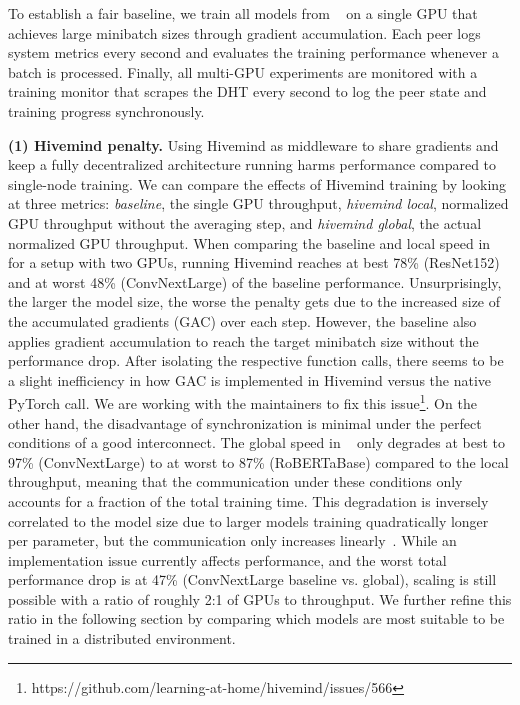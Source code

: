 To establish a fair baseline, we train all models from ~ on a single GPU that achieves large minibatch sizes through gradient accumulation.
Each peer logs system metrics every second and evaluates the training performance whenever a batch is processed.
Finally, all multi-GPU experiments are monitored with a training monitor that scrapes the DHT every second to log the peer state and training progress synchronously.

\textbf{(1) Hivemind penalty.} Using Hivemind as middleware to share gradients and keep a fully decentralized architecture running harms performance compared to single-node training. 
We can compare the effects of Hivemind training by looking at three metrics: \textit{baseline}, the single GPU throughput, \textit{hivemind local}, normalized GPU throughput without the averaging step, and \textit{hivemind global}, the actual normalized GPU throughput.
When comparing the baseline and local speed in ~ for a setup with two GPUs, running Hivemind reaches at best 78\% (ResNet152) and at worst 48\% (ConvNextLarge) of the baseline performance.
Unsurprisingly, the larger the model size, the worse the penalty gets due to the increased size of the accumulated gradients (GAC) over each step.
However, the baseline also applies gradient accumulation to reach the target minibatch size without the performance drop.
After isolating the respective function calls, there seems to be a slight inefficiency in how GAC is implemented in Hivemind versus the native PyTorch call.
We are working with the maintainers to fix this issue\footnote{https://github.com/learning-at-home/hivemind/issues/566}.
On the other hand, the disadvantage of synchronization is minimal under the perfect conditions of a good interconnect.
The global speed in ~ only degrades at best to 97\% (ConvNextLarge) to at worst to 87\% (RoBERTaBase) compared to the local throughput, meaning that the communication under these conditions only accounts for a fraction of the total training time.
This degradation is inversely correlated to the model size due to larger models training quadratically longer per parameter, but the communication only increases linearly~\cite{ryabinin2023swarm}.
While an implementation issue currently affects performance, and the worst total performance drop is at 47\% (ConvNextLarge baseline vs. global), scaling is still possible with a ratio of roughly 2:1 of GPUs to throughput.
We further refine this ratio in the following section by comparing which models are most suitable to be trained in a distributed environment.
 
